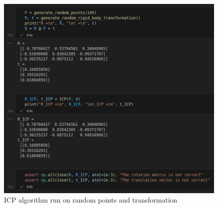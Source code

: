 \documentclass[conference,onecolumn]{IEEEtran}
\begin{document}
\begin{enumerate}[label=\arabic{enumi}.]
          \begin{figure}[h]
              \centering
              \includegraphics[width=.99\linewidth]{figs/ICP.png}
              \caption{ICP algorithm run on random points and transformation}
          \end{figure}
\end{enumerate}
\end{document}

